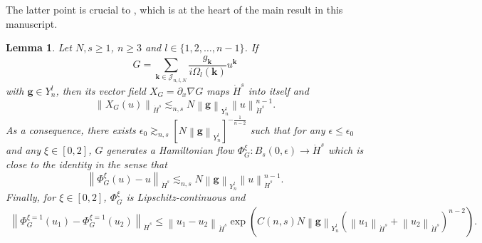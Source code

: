 \documentclass[a4paper,10pt,reqno]{article}
\theoremstyle{definition}
\theoremstyle{plain}
\theoremstyle{plain}
\theoremstyle{definition}
\theoremstyle{plain}
\theoremstyle{plain}
\theoremstyle{plain}
\newtheorem{lemma}[definition]{Lemma}
\theoremstyle{definition}
\theoremstyle{definition}
\newcommand{\norm}[1]{\left\lVert #1 \right\rVert}
\begin{document}
The latter point is crucial to , which is at the heart of the main result in this manuscript.

\begin{lemma} \label{lemma: transformations preserve Hs}
Let $N, s\ge 1$, $n \ge 3$ and $l \in \{ 1,2,\ldots,n-1\}$.
If 
\begin{equation}\label{eq:G}
G = \sum_{\bm{k} \in \mathcal{J}_{n,l,N}} \frac{g_{\bm{k}}}{i \Omega_l(\bm{k})} u^{\bm{k}}
\end{equation}
with $\bm{g} \in Y_n^{l}$, then its vector field $X_G = \partial_x \nabla G$ maps $\dot{H}^s$ into itself and 
\[
\norm{X_G(u)}_{\dot{H}^s} \lesssim_{n,s} N \norm{\bm{g}}_{Y_n^{l}} \norm{u}_{\dot{H}^s}^{n-1}.
\]
As a consequence, there exists $\epsilon_0 \gtrsim_{n,s} [N \norm{\bm{g}}_{Y_n^{l}}]^{-\frac{1}{n-2}}$ such that for any $\epsilon \le \epsilon_0$ and any $\xi \in [0,2]$, $G$ generates a Hamiltonian flow $\Phi_G^{\xi} : B_s(0,\epsilon) \rightarrow \dot{H}^s$ which is close to the identity in the sense that
\begin{equation}
\norm{\Phi_G^{\xi}(u)-u}_{\dot{H}^s} \lesssim_{n,s} N \norm{\bm{g}}_{Y_n^{l}} \norm{u}_{\dot{H}^s}^{n-1}.
\label{eq: close to the identity 1}
\end{equation}
Finally, for $\xi \in [0,2]$, $\Phi_G^{\xi}$ is Lipschitz-continuous and
\begin{align}
\norm{\Phi_{G}^{\xi=1}(u_1)-\Phi_{G}^{\xi=1}(u_2)}_{\dot{H}^s} \le \norm{u_1-u_2}_{\dot{H}^s} \exp \left ( C(n,s) N \norm{\bm{g}}_{Y_n^l} (\norm{u_1}_{\dot{H}^s}+\norm{u_2}_{\dot{H}^s})^{n-2} \right ) 
\label{eq: lipschitz continuity of phi}.
\end{align}
\end{lemma}
\end{document}
